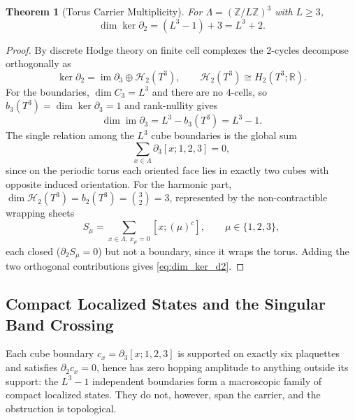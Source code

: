 \documentclass[11pt,a4paper]{article}
\newtheorem{theorem}{Theorem}[section]
\theoremstyle{definition}
\newcommand{\R}{\mathbb{R}}
\newcommand{\Z}{\mathbb{Z}}
\begin{document}
\begin{theorem}[Torus Carrier Multiplicity]\label{thm:carrier_multiplicity}
For $\Lambda = (\Z/L\Z)^3$ with $L \ge 3$,
\begin{equation}\label{eq:dim_ker_d2}
  \dim\ker\partial_2 = (L^3-1) + 3 = L^3 + 2 .
\end{equation}
\end{theorem}

\begin{proof}
By discrete Hodge theory on finite cell complexes \cite{Eckmann1944,Forman1998} the $2$-cycles decompose orthogonally as
\begin{equation}\label{eq:hodge_cycle_decomp}
  \ker\partial_2 = \operatorname{im}\partial_3 \oplus \mathcal{H}_2(T^3), \qquad \mathcal{H}_2(T^3) \cong H_2(T^3;\R).
\end{equation}
For the boundaries, $\dim C_3 = L^3$ and there are no $4$-cells, so $b_3(T^3) = \dim\ker\partial_3 = 1$ and rank-nullity gives
\begin{equation}
  \dim\operatorname{im}\partial_3 = L^3 - b_3(T^3) = L^3 - 1 .
\end{equation}
The single relation among the $L^3$ cube boundaries is the global sum
\begin{equation}\label{eq:cube_sum_relation}
  \sum_{x\in\Lambda}\partial_3[x;1,2,3] = 0,
\end{equation}
since on the periodic torus each oriented face lies in exactly two cubes with opposite induced orientation. For the harmonic part, $\dim\mathcal{H}_2(T^3) = b_2(T^3) = \binom{3}{2} = 3$, represented by the non-contractible wrapping sheets
\begin{equation}\label{eq:toron_sheets}
  S_\mu = \sum_{x\in\Lambda,\ x_\mu = 0}[x;(\mu)^c], \qquad \mu\in\{1,2,3\},
\end{equation}
each closed ($\partial_2 S_\mu = 0$) but not a boundary, since it wraps the torus. Adding the two orthogonal contributions gives \eqref{eq:dim_ker_d2}.
\end{proof}

\subsection{Compact Localized States and the Singular Band Crossing}

Each cube boundary $c_x = \partial_3[x;1,2,3]$ is supported on exactly six plaquettes and satisfies $\partial_2 c_x = 0$, hence has zero hopping amplitude to anything outside its support: the $L^3-1$ independent boundaries form a macroscopic family of compact localized states. They do not, however, span the carrier, and the obstruction is topological.
\end{document}
